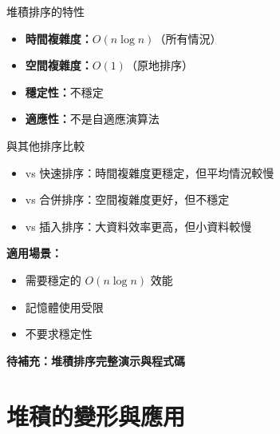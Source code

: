 \documentclass{beamer}
\begin{document}
\begin{frame}{堆積排序的特性}
\begin{itemize}
    \item \textbf{時間複雜度：}$O(n \log n)$（所有情況）
    \item \textbf{空間複雜度：}$O(1)$（原地排序）
    \item \textbf{穩定性：}不穩定
    \item \textbf{適應性：}不是自適應演算法
\end{itemize}

\vspace{1em}
\begin{block}{與其他排序比較}
\begin{itemize}
    \item vs 快速排序：時間複雜度更穩定，但平均情況較慢
    \item vs 合併排序：空間複雜度更好，但不穩定
    \item vs 插入排序：大資料效率更高，但小資料較慢
\end{itemize}
\end{block}

\vspace{1em}
\textbf{適用場景：}
\begin{itemize}
    \item 需要穩定的 $O(n \log n)$ 效能
    \item 記憶體使用受限
    \item 不要求穩定性
\end{itemize}

\vspace{1em}
\textbf{待補充：堆積排序完整演示與程式碼}
\end{frame}

\section{堆積的變形與應用}
\end{document}
